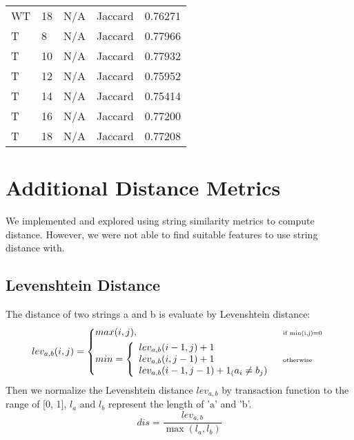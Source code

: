 \documentclass{article}
\begin{document}
\begin{center}
\begin{supertabular}{| l | l | l | l | l |}
            WT & 18 & N/A & Jaccard & 0.76271 \\
            T & 8 & N/A & Jaccard & 0.77966 \\
            T & 10 & N/A & Jaccard & 0.77932 \\
            T & 12 & N/A & Jaccard & 0.75952 \\
            T & 14 & N/A & Jaccard & 0.75414 \\
            T & 16 & N/A & Jaccard & 0.77200 \\
            T & 18 & N/A & Jaccard & 0.77208 \\
      \end{supertabular}
\end{center}

\section{Additional Distance Metrics}
\label{additional-distance-metrics}

We implemented and explored using string similarity metrics to compute distance.
However, we were not able to find suitable features to use string distance with.

\subsection{Levenshtein Distance}
The distance of two strings a and b is evaluate by Levenshtein distance:
\begin{equation}
  lev_{a,b}(i,j) = \left \{
  \begin{aligned}
    &max(i,j), && \text{\tiny if min(i,j)=0}\  \\
    &
    min= \left\{
    \begin{array}{ll}
    lev_{a,b}(i-1,j)+1\\
    lev_{a,b}(i,j-1)+1\\
    lev_{a,b}(i-1,j-1)+1_(a_{i}\not=b_{j})
    \end{array}\right.
    && \text{\tiny otherwise}
  \end{aligned} \right.
\end{equation}
Then we normalize the Levenshtein distance $lev_{a,b}$ by transaction function to the range of [0, 1], $l_{a}$ and $l_{b}$ represent the length of 'a' and 'b'.
$$dis = \frac{lev_{a,b}}{{\max}(l_{a}, l_{b})}  $$
\end{document}
